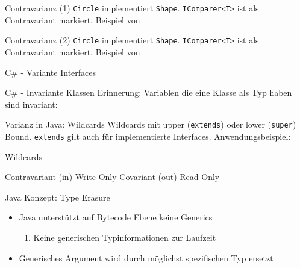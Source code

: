 \documentclass[11pt]{beamer}
\begin{document}
\begin{frame}{Contravarianz (1)}
\tiny{
\texttt{Circle} implementiert \texttt{Shape}. \texttt{IComparer<T>} ist als Contravariant markiert.}
Beispiel von \cite{csharp_example_contravariance}
\end{frame}

\begin{frame}{Contravarianz (2)}
\tiny{
\texttt{Circle} implementiert \texttt{Shape}. \texttt{IComparer<T>} ist als Contravariant markiert.}
Beispiel von \cite{csharp_example_contravariance}
\end{frame}


\begin{frame}{C\# - Variante Interfaces}
\end{frame}


\begin{frame}{C\# - Invariante Klassen}
	Erinnerung: 
	Variablen die eine Klasse als Typ haben sind invariant:
\end{frame}

\begin{frame}{Varianz in Java: Wildcards}
		Wildcards mit upper (\texttt{extends}) oder lower (\texttt{super}) Bound. \texttt{extends} gilt auch für implementierte Interfaces.
		Anwendungsbeispiel:
\end{frame}

\begin{frame}{Wildcards}

		Contravariant (\glqq in\grqq{}) Write-Only
	Covariant (\glqq out\grqq{}) Read-Only

\end{frame}


\begin{frame}{Java Konzept: Type Erasure}
	\begin{itemize}
	\item Java unterstützt auf Bytecode Ebene keine Generics
	\begin{enumerate}
		\item Keine generischen Typinformationen zur Laufzeit
	\end{enumerate}
	\item Generisches Argument wird durch möglichst spezifischen Typ ersetzt
	\end{itemize}
\end{frame}
\end{document}
